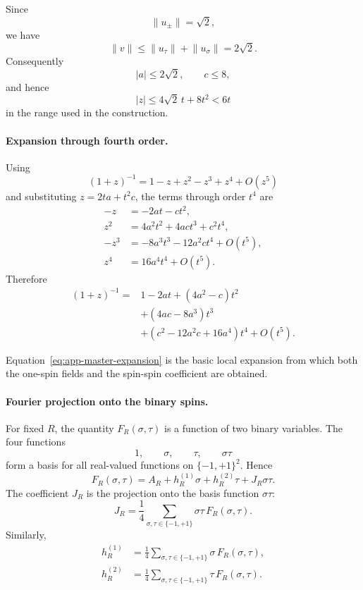 \documentclass[12pt,a4paper]{article}
\newcommand{\norm}[1]{\lVert #1\rVert}
\newcommand{\sgnspin}{\{-1,+1\}}
\begin{document}
Since
\[
\norm{u_\pm}=\sqrt2,
\]
we have
\[
\norm v
\le
\norm{u_\tau}+\norm{u_\sigma}
=
2\sqrt2.
\]
Consequently
\[
|a|\le2\sqrt2,
\qquad
c\le8,
\]
and hence
\[
|z|
\le
4\sqrt2\,t+8t^2
<6t
\]
in the range used in the construction.

\paragraph{Expansion through fourth order.}

Using
\[
(1+z)^{-1}
=
1-z+z^2-z^3+z^4+O(z^5)
\]
and substituting $z=2ta+t^2c$, the terms through order $t^4$ are
\begin{align}
-z
&=-2at-c t^2,
\\
z^2
&=
4a^2t^2+4ac t^3+c^2t^4,
\\
-z^3
&=
-8a^3t^3-12a^2c t^4+O(t^5),
\\
z^4
&=
16a^4t^4+O(t^5).
\end{align}
Therefore
\begin{equation}
\label{eq:app-master-expansion}
\begin{aligned}
(1+z)^{-1}
={}&
1
-2a t
+(4a^2-c)t^2
\\
&+(4ac-8a^3)t^3
\\
&+(c^2-12a^2c+16a^4)t^4
+O(t^5).
\end{aligned}
\end{equation}

Equation~\eqref{eq:app-master-expansion} is the basic local expansion
from which both the one-spin fields and the spin-spin coefficient are
obtained.

\paragraph{Fourier projection onto the binary spins.}

For fixed $R$, the quantity $F_R(\sigma,\tau)$ is a function of two
binary variables.  The four functions
\[
1,\qquad \sigma,\qquad \tau,\qquad \sigma\tau
\]
form a basis for all real-valued functions on
$\{-1,+1\}^2$.  Hence
\[
F_R(\sigma,\tau)
=
A_R+h_R^{(1)}\sigma+h_R^{(2)}\tau+J_R\sigma\tau.
\]
The coefficient $J_R$ is the projection onto the basis function
$\sigma\tau$:
\begin{equation}
\label{eq:app-PJ}
J_R
=
\frac14
\sum_{\sigma,\tau\in\sgnspin}
\sigma\tau\,F_R(\sigma,\tau).
\end{equation}
Similarly,
\begin{align}
h_R^{(1)}
&=
\frac14
\sum_{\sigma,\tau\in\sgnspin}
\sigma\,F_R(\sigma,\tau),
\label{eq:app-Ph1}\\
h_R^{(2)}
&=
\frac14
\sum_{\sigma,\tau\in\sgnspin}
\tau\,F_R(\sigma,\tau).
\label{eq:app-Ph2}
\end{align}
\end{document}
